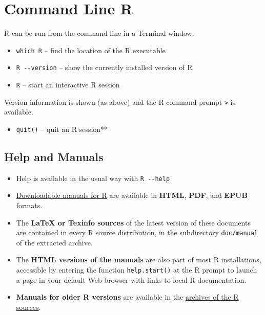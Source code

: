 \documentclass[]{book}
\providecommand{\tightlist}{%
  \setlength{\itemsep}{0pt}\setlength{\parskip}{0pt}}
\theoremstyle{definition}
\theoremstyle{definition}
\theoremstyle{definition}
\theoremstyle{remark}
\begin{document}
\hypertarget{command-line-r}{%
\section{Command Line R}\label{command-line-r}}

R can be run from the command line in a Terminal window:

\begin{itemize}
\tightlist
\item
  \texttt{which\ R} -- find the location of the R executable
\item
  \texttt{R\ -\/-version} -- show the currently installed version of R
\item
  \texttt{R} -- start an interactive R session
\end{itemize}

Version information is shown (as above) and the R command prompt
\texttt{\textgreater{}} is available.

\begin{itemize}
\tightlist
\item
  \texttt{quit()} -- quit an R session**
\end{itemize}

\hypertarget{help-and-manuals}{%
\subsection{Help and Manuals}\label{help-and-manuals}}

\begin{itemize}
\item
  Help is available in the usual way with \texttt{R\ -\/-help}
\item
  \href{https://cran.r-project.org/manuals.html}{Downloadable manuals
  for R} are available in \textbf{HTML}, \textbf{PDF}, and \textbf{EPUB}
  formats.
\item
  The \textbf{LaTeX or Texinfo sources} of the latest version of these
  documents are contained in every R source distribution, in the
  subdirectory \texttt{doc/manual} of the extracted archive.
\item
  The \textbf{HTML versions of the manuals} are also part of most R
  installations, accessible by entering the function
  \texttt{help.start()} at the R prompt to launch a page in your default
  Web browser with links to local R documentation.
\item
  \textbf{Manuals for older R versions} are available in the
  \href{https://cran.r-project.org/src/base/}{archives of the R
  sources}.
\end{itemize}
\end{document}
